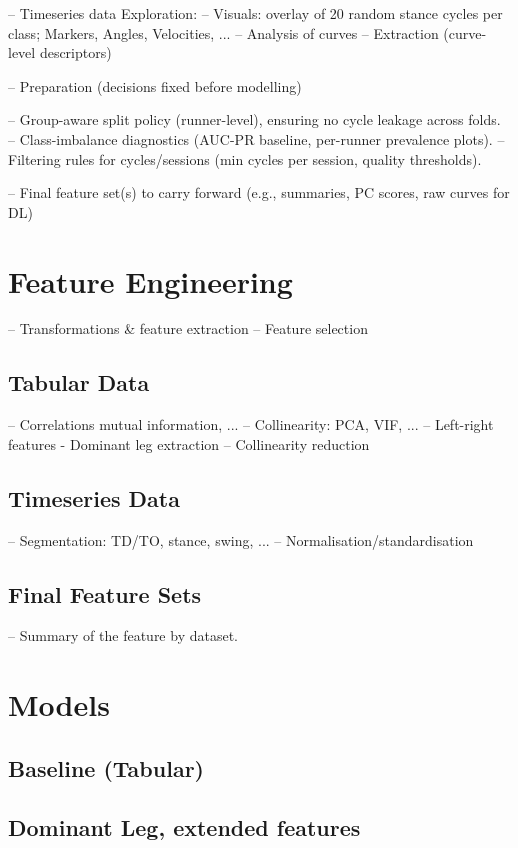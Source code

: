 -- Timeseries data Exploration:
-- Visuals: overlay of 20 random stance cycles per class; Markers, Angles, Velocities, ...
-- Analysis of curves
-- Extraction (curve-level descriptors)


-- Preparation (decisions fixed before modelling)

-- Group-aware split policy (runner-level), ensuring no cycle leakage across folds.
-- Class-imbalance diagnostics (AUC-PR baseline, per-runner prevalence plots).
-- Filtering rules for cycles/sessions (min cycles per session, quality thresholds).

-- Final feature set(s) to carry forward (e.g., summaries, PC scores, raw curves for DL)

\section{Feature Engineering}\label{sec:method-feature-engineering}
-- Transformations & feature extraction
-- Feature selection

\subsection{Tabular Data}\label{subsec:method-tabular-data}
-- Correlations mutual information, ...
-- Collinearity: PCA, VIF, ...
-- Left-right features - Dominant leg extraction
-- Collinearity reduction

\subsection{Timeseries Data}\label{subsec:method-timeseries-data}
-- Segmentation: TD/TO, stance, swing, ...
-- Normalisation/standardisation

\subsection{Final Feature Sets}\label{subsec:method-final-feature-sets}
-- Summary of the feature by dataset.

\section{Models}\label{sec:method-models}
\subsection{Baseline (Tabular)}\label{subsec:baselines}
\subsection{Dominant Leg, extended features}\label{subsec:baselines-timeseries}  %
